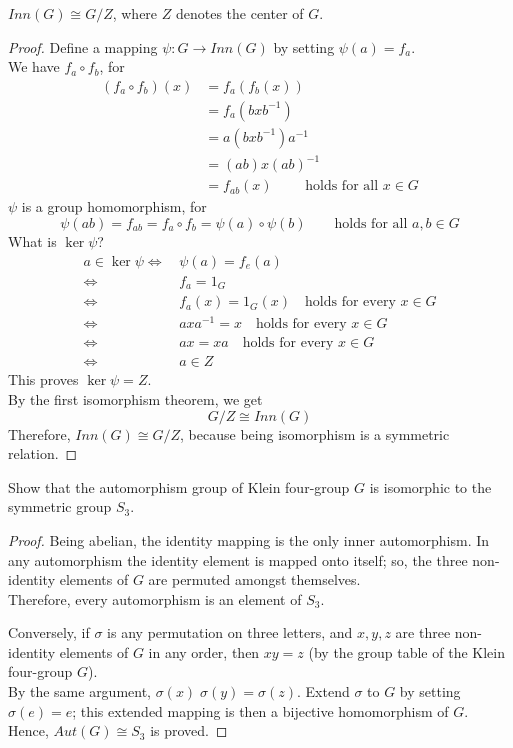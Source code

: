 \documentclass[../main-sheet.tex]{subfiles}
\begin{document}
\begin{thm}
    \(Inn (G)\cong G/Z\), where \(Z \) denotes the center of \(G \).
\end{thm}
\begin{proof}
    Define a mapping \(\psi:G\to Inn(G)\) by setting \(\psi(a)=f_a \).\\
    We have \(f_a\circ f_b \), for
    \begin{align*}
        (f_a\circ f_b)(x)&=f_a(f_b(x))\\
        &=f_a(bxb^{-1})\\
        &=a(bxb^{-1})a^{-1}\\
        &=(ab)x(ab)^{-1}\\
        &=f_{ab}(x)\qquad\text{ holds for all }x\in G
    \end{align*}
    \(\psi \) is a group homomorphism, for
    \[\psi(ab)=f_{ab}=f_a\circ f_b=\psi(a)\circ\psi(b)\qquad \text{holds for all } a,b\in G\]
    What is \(\ker \psi\)?\\
    \begin{align*}
        a\in \ker \psi \Leftrightarrow\, & \psi(a)=f_e(a)\\
         \Leftrightarrow\, & f_a=1_G\\
         \Leftrightarrow\, & f_a(x)=1_G(x)\quad \text{holds for every }x\in G\\
         \Leftrightarrow\, & axa^{-1}=x\quad \text{holds for every }x\in G\\
         \Leftrightarrow\, & ax=xa\quad \text{holds for every }x\in G\\
         \Leftrightarrow\, & a\in Z
    \end{align*}
    This proves \(\ker \psi=Z\).\\
    By the first isomorphism theorem, we get
    \[  G/Z\cong Inn (G)\]
    Therefore, \(Inn(G)\cong G/Z\), because being isomorphism is a symmetric relation.
\end{proof}
\begin{ex}
    Show that the automorphism group of Klein four-group \(G  \) is isomorphic to the symmetric group \(S_3 \).
\end{ex}
\begin{proof}
    Being abelian, the identity mapping is the only inner automorphism. In any automorphism the identity element is mapped onto itself; so, the three non-identity elements of \(G \) are permuted amongst themselves.\\
    Therefore, every automorphism is an element of \(S_3 \).

    Conversely, if \(\sigma\) is any permutation on three letters, and \(x,y,z \) are three non-identity elements of \(G \) in any order, then \(xy=z \) (by the group table of the Klein four-group \(G\)).\\
    By the same argument, \(\sigma(x)\;\sigma(y)=\sigma(z )\). Extend \(\sigma\) to \(G \) by setting \(\sigma(e)=e \); this extended mapping is then a bijective homomorphism of \(G \).\\
    Hence, \(Aut(G)\cong S_3\) is proved.
\end{proof}
\end{document}
